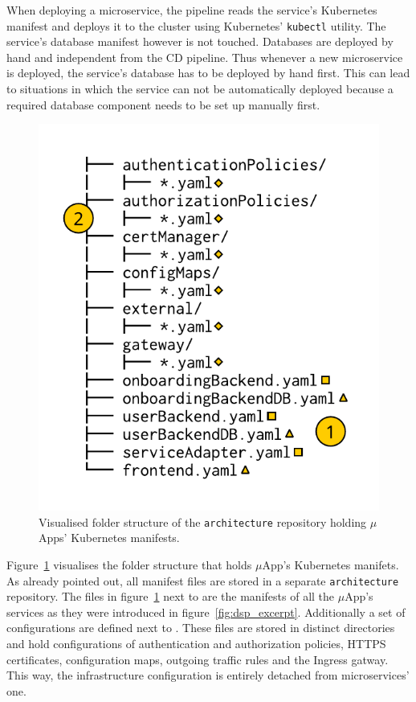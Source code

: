 When deploying a microservice, the pipeline reads the service's Kubernetes
manifest and deploys it to the cluster using Kubernetes' \texttt{kubectl}
utility. The service's database manifest however is not touched. Databases are
deployed by hand and independent from the \ac{CD} pipeline. Thus whenever a new
microservice is deployed, the service's database has to be deployed by hand
first. This can lead to situations in which the service can not be
automatically deployed because a required database component needs to be set up
manually first.

\begin{figure}[H]
\begin{center}
  \includegraphics[scale=0.8]{images/figures/manifests_folder_naive.pdf}
\end{center}
\caption{Visualised folder structure of the \texttt{architecture} repository
holding $\mu$Apps' Kubernetes manifests.}%
\label{fig:manifests_folder_naive}
\end{figure}

Figure~\ref{fig:manifests_folder_naive} visualises the folder structure that
holds $\mu$App's Kubernetes manifets. As already pointed out, all manifest
files are stored in a separate \texttt{architecture} repository. The files in
figure~\ref{fig:manifests_folder_naive} next to  are the manifests
of all the $\mu$App's services as they were introduced in
figure~\ref{fig:dsp_excerpt}. Additionally a set of configurations are defined
next to . These files are stored in distinct directories and hold
configurations of authentication and authorization policies, \ac{HTTPS}
certificates, configuration maps, outgoing traffic rules and the Ingress
gatway. This way, the infrastructure configuration is entirely detached from
microservices' one.

